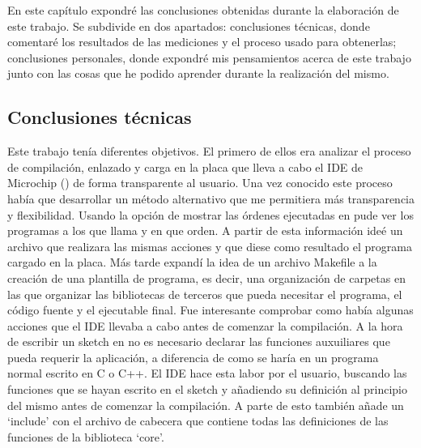 En este capítulo expondré las conclusiones obtenidas durante la elaboración de este trabajo. Se subdivide en dos apartados: conclusiones técnicas, donde comentaré los resultados de las mediciones y el proceso usado para obtenerlas; conclusiones personales, donde expondré mis pensamientos acerca de este trabajo junto con las cosas que he podido aprender durante la realización del mismo.

\subsection{Conclusiones técnicas}
Este trabajo tenía diferentes objetivos. El primero de ellos era analizar el proceso de compilación, enlazado y carga en la placa que lleva a cabo el IDE de Microchip () de forma transparente al usuario. Una vez conocido este proceso había que desarrollar un método alternativo que me permitiera más transparencia y flexibilidad. Usando la opción de mostrar las órdenes ejecutadas en  pude ver los programas a los que llama y en que orden. A partir de esta información ideé un archivo  que realizara las mismas acciones y que diese como resultado el programa cargado en la placa. Más tarde expandí la idea de un archivo Makefile a la creación de una plantilla de programa, es decir, una organización de carpetas en las que organizar las bibliotecas de terceros que pueda necesitar el programa, el código fuente y el ejecutable final. Fue interesante comprobar como había algunas acciones que el IDE llevaba a cabo antes de comenzar la compilación. A la hora de escribir un sketch en  no es necesario declarar las funciones auxuiliares que pueda requerir la aplicación, a diferencia de como se haría en un programa normal escrito en C o C++. El IDE hace esta labor por el usuario, buscando las funciones que se hayan escrito en el sketch y añadiendo su definición al principio del mismo antes de comenzar la compilación. A parte de esto también añade un `include' con el archivo de cabecera que contiene todas las definiciones de las funciones de la biblioteca `core'.

